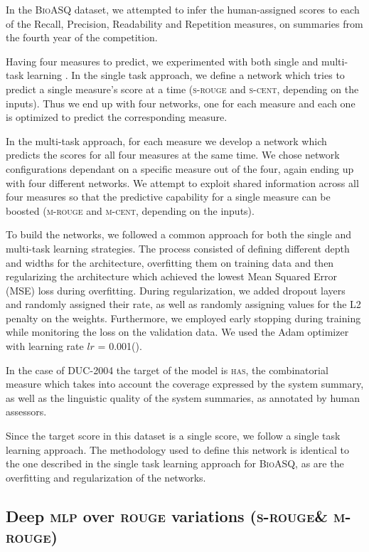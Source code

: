 \documentclass[11pt,a4paper]{article}
\newcommand{\rouge}{\textsc{rouge}\xspace}
\newcommand{\mlp}{\textsc{mlp}\xspace}
\newcommand{\bioasq}{\textsc{BioASQ}\xspace}
\newcommand{\duc}{\textsc{DUC-2004}\xspace}
\newcommand{\srouge}{\textsc{s-rouge}\xspace}
\newcommand{\mrouge}{\textsc{m-rouge}\xspace}
\newcommand{\scent}{\textsc{s-cent}\xspace}
\newcommand{\mcent}{\textsc{m-cent}\xspace}
\newcommand{\has}{\textsc{has}\xspace}
\begin{document}
In the \bioasq dataset, we attempted to infer the  human-assigned scores 
to each of the Recall, Precision, Readability and Repetition measures, 
on summaries from the fourth year of the competition.

Having four measures to predict, we experimented with both single and multi-task 
learning . In the single task approach, we define a network which tries to 
predict a single measure’s score at a time (\srouge and \scent, depending on 
the inputs). Thus we end up with four networks, one for each measure and each 
one is optimized to predict the corresponding measure.

In the multi-task approach, for each measure we develop a network which predicts 
the scores for all four measures at the same time. We chose network 
configurations dependant on a specific measure out of the four, again 
ending up with four different networks. We attempt to exploit shared information 
across all four measures so that the predictive capability for a single 
measure can be boosted (\mrouge and \mcent, depending on the inputs).

To build the networks, we followed a common approach for both the single and multi-task
learning strategies. The process consisted of defining different depth and widths for
the architecture, overfitting them on training data and then regularizing the 
architecture which achieved the lowest Mean Squared Error (\textsc{MSE})
loss during overfitting. During regularization, we added dropout layers and 
randomly assigned their rate, as well as randomly assigning values for the L2 penalty 
on the weights. Furthermore, we employed early stopping during training while 
monitoring the loss on the validation data. We used the Adam optimizer with 
learning rate $lr$ = 0.001(\cite{Kingma:2014}).

In the case of \duc the target of the model is \has, the combinatorial measure which 
takes into account the coverage expressed by the system summary, as well as the linguistic 
quality of the system summaries, as annotated by human assessors.

Since the target score in this dataset is a single score, we follow a single task learning 
approach. The methodology used to define this network is identical to the one described in 
the single task learning approach for \bioasq, as are the overfitting and regularization of 
the networks.

\subsection{Deep \mlp over \rouge variations (\srouge \& \mrouge)}
\label{ssec:rouge}
\end{document}
